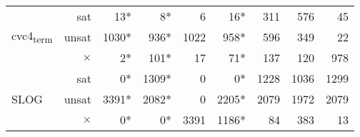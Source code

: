 \begin{table*}[t]
\begin{tabular}{l r | r r r r r r r}
\multirow{3}{*}{cvc4\textsubscript{term}} & sat & 13* & 8* &     6 &     16*  & 311 & 576 & 45 \\
							& unsat    &  1030*   &   936* &  1022 &    958*  & 596 & 349 & 22 \\
							& $\times$ &     2*   &   101* &    17 &     71*  & 137 & 120 & 978 \\ \hline
\multirow{3}{*}{SLOG}  		& sat      & 0* & 1309* & 0 & 0* & 1228 & 1036 & 1299 \\
							& unsat    & 3391* & 2082* & 0 & 2205* & 2079 & 1972 & 2079 \\
							& $\times$ & 0* & 0* & 3391 & 1186* & 84 & 383 & 13 \\ \hline
\end{tabular}
\label{table:base_benchmark}
\end{table*}

